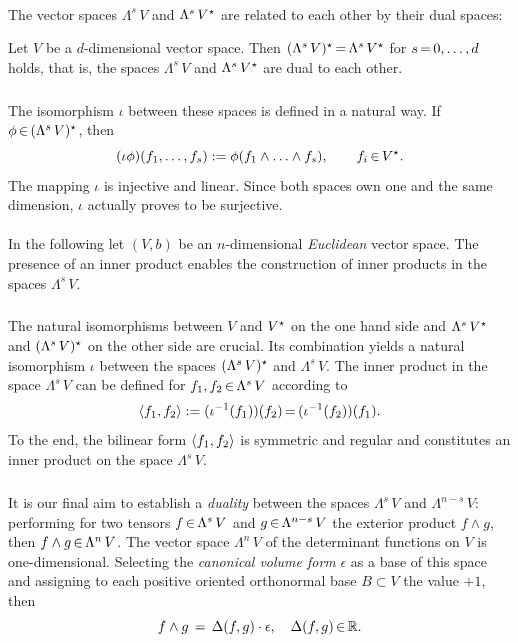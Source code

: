 \documentclass[11pt,twoside]{article}
\begin{document}
\paragraph{}
The vector spaces $\Lambda^s\,V$ and $\Lambda^s\,V^{\star}$ are related
to each other by their dual spaces:

\begin{theorem}
Let $V$ be a $d$-dimensional vector space.
Then $(\Lambda^s \, V)^\star {\,=\,} \Lambda^s \, V^\star$ for $s {\,=\,} 0,\ldots,d$ holds,
that is,
the spaces $\Lambda^s \, V$ and $\Lambda^s \, V^\star$ are dual to each other.
\end{theorem}

\subparagraph{}
The isomorphism $\iota$ between these spaces is defined in a natural way.
If $\phi {\,\in\,} (\Lambda^s\,V)^\star$, then
\[
(\iota \phi)(f_1,\ldots,f_s) := \phi(f_1 \wedge \ldots \wedge f_s),
\qquad f_i {\,\in\,} V^{\star}.
\]
The mapping $\iota$ is injective and linear.
Since both spaces own one and the same dimension,
$\iota$ actually proves to be surjective.

\paragraph{}
In the following
let $(V,b)$ be an $n$-dimensional \textit{Euclidean} vector space. 
The presence of an inner product enables the construction of inner products
in the spaces $\Lambda^s\, V$.

\subparagraph{}
The natural isomorphisms between $V$ and $V^\star$ on the one hand side and
$\Lambda^s\,V^\star$ and $(\Lambda^s\,V)^\star$ on the other side are crucial.
Its combination yields a natural isomorphism $\iota$
between the spaces $(\Lambda^s\,V)^\star$ and $\Lambda^s\,V$.
The inner product in the space $\Lambda^s\,V$ can be defined for
$f_1,f_2 {\,\in\,} \Lambda^s\,V$ according to
\[
\left<f_1,f_2\right> := (\iota^{-1}(f_1))(f_2) {\,=\,} (\iota^{-1}(f_2))(f_1).
\]
To the end,
the bilinear form $\left<f_1,f_2\right>$ is symmetric and regular and constitutes
an inner product on the space $\Lambda^s\,V$.

\subparagraph{}
It is our final aim to establish a \textit{duality} between the spaces 
$\Lambda^s\,V$ and $\Lambda^{n-s}\,V$:
performing for two tensors $f {\,\in\,} \Lambda^s\,V$ and
$g {\,\in\,} \Lambda^{n-s}\,V$ the exterior product $f \wedge g$,
then $f \wedge g {\,\in\,} \Lambda^n\,V$.
The vector space $\Lambda^n\,V$ of the determinant functions on $V$
is one-dimensional.
Selecting the \textit{canonical volume form} $\epsilon$ as a base
of this space and
assigning to each positive oriented orthonormal base $B \subset V$
the value $+1$,
then
\[
f \wedge g \,=\, \Delta(f,g) \cdot \epsilon, \quad \Delta(f,g) {\,\in\,} {\mathbb{R}}.
\]
\end{document}
